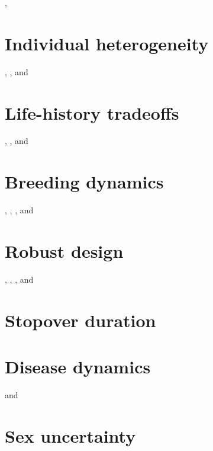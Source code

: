 \documentclass[
  12pt,
]{krantz}
\begin{document}
\citet{choquet_semi-markov_2011}, \citet{peron_evidence_2016}

\hypertarget{heterogeneity}{%
\chapter{Individual heterogeneity}\label{heterogeneity}}

\citet{cubaynes_importance_2010}, \citet{gimenez_individual_2010}, and \citet{turek_bayesian_2021}

\hypertarget{tradeoffs}{%
\chapter{Life-history tradeoffs}\label{tradeoffs}}

\citet{morano_life-history_2013}, \citet{shefferson_life_2003}, and \citet{cruz-flores_sex-specific_nodate}

\hypertarget{breeding}{%
\chapter{Breeding dynamics}\label{breeding}}

\citet{pradel_breeding_2012}, \citet{desprez_now_2011}, \citet{desprez_known_2013}, and \citet{pacoureau_population_2019}

\hypertarget{rd}{%
\chapter{Robust design}\label{rd}}

\citet{karamanlidis_evidence_2015}, \citet{santostasi_robust_2016}, \citet{gibson_application_2018}, and \citet{rankin_full-capture_2016}

\hypertarget{stopover}{%
\chapter{Stopover duration}\label{stopover}}

\citet{guerin_advances_2017}

\hypertarget{disease}{%
\chapter{Disease dynamics}\label{disease}}

\citet{MarescotEtAl2018} and \citet{santoro_multi-event_2014}

\hypertarget{sex}{%
\chapter{Sex uncertainty}\label{sex}}
\end{document}
